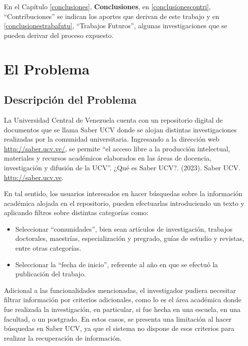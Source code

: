 \documentclass[
  12pt,
  openany]{book}
\begin{document}
En el Capítulo \ref{conclusiones}, \textbf{Conclusiones}, en \ref{conclusionescontri}, ``Contribuciones'' se indican los aportes que derivan de este trabajo y en \ref{conclusionestrabafutu}, ``Trabajos Futuros'', algunas investigaciones que se pueden derivar del proceso expuesto.

\hypertarget{capproblema}{%
\chapter{El Problema}\label{capproblema}}

\hypertarget{desproblema}{%
\section{Descripción del Problema}\label{desproblema}}

La Universidad Central de Venezuela cuenta con un repositorio digital de documentos que se llama Saber UCV donde se alojan distintas investigaciones realizadas por la comunidad universitaria. Ingresando a la dirección web \url{http://saber.ucv.ve/}, se permite ``el acceso libre a la producción intelectual, materiales y recursos académicos elaborados en las áreas de docencia, investigación y difusión de la UCV''. ¿Qué es Saber UCV?. (2023). Saber UCV. \href{http://saber.ucv.ve/}{http://saber.ucv.ve}.

En tal sentido, los usuarios interesados en hacer búsquedas sobre la información académica alojada en el repositorio, pueden efectuarlas introduciendo un texto y aplicando filtros sobre distintas categorías como:

\begin{itemize}
\item
  Seleccionar ``comunidades'', bien sean artículos de investigación, trabajos doctorales, maestrías, especialización y pregrado, guías de estudio y revistas, entre otras categorías.
\item
  Seleccionar la ``fecha de inicio'', referente al año en que se efectuó la publicación del trabajo.
\end{itemize}

Adicional a las funcionalidades mencionadas, el investigador pudiera necesitar filtrar información por criterios adicionales, como lo es el área académica donde fue realizada la investigación, en particular, si fue hecha en una escuela, en una facultad, o un postgrado. En estos casos, se presenta una limitación al hacer búsquedas en Saber UCV, ya que el sistema no dispone de esos criterios para realizar la recuperación de información.
\end{document}
